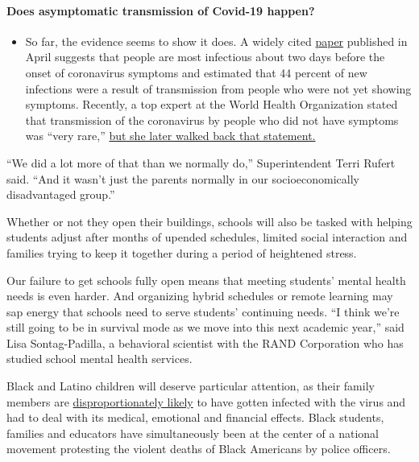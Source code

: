\begin{itemize}
{  \paragraph{Does asymptomatic transmission of Covid-19
  happen?}\label{does-asymptomatic-transmission-of-covid-19-happen}}

  \begin{itemize}
  \tightlist
  \item
    So far, the evidence seems to show it does. A widely cited
    \href{https://www.nature.com/articles/s41591-020-0869-5}{paper}
    published in April suggests that people are most infectious about
    two days before the onset of coronavirus symptoms and estimated that
    44 percent of new infections were a result of transmission from
    people who were not yet showing symptoms. Recently, a top expert at
    the World Health Organization stated that transmission of the
    coronavirus by people who did not have symptoms was ``very rare,''
    \href{https://www.nytimes.com/2020/06/09/world/coronavirus-updates.html?action=click\&pgtype=Article\&state=default\&region=MAIN_CONTENT_3\&context=storylines_faq\#link-1f302e21}{but
    she later walked back that statement.}
  \end{itemize}
\end{itemize}

``We did a lot more of that than we normally do,'' Superintendent Terri
Rufert said. ``And it wasn't just the parents normally in our
socioeconomically disadvantaged group.''

Whether or not they open their buildings, schools will also be tasked
with helping students adjust after months of upended schedules, limited
social interaction and families trying to keep it together during a
period of heightened stress.

Our failure to get schools fully open means that meeting students'
mental health needs is even harder. And organizing hybrid schedules or
remote learning may sap energy that schools need to serve students'
continuing needs. ``I think we're still going to be in survival mode as
we move into this next academic year,'' said Lisa Sontag-Padilla, a
behavioral scientist with the RAND Corporation who has studied school
mental health services.

Black and Latino children will deserve particular attention, as their
family members are
\href{https://www.nytimes.com/interactive/2020/07/05/us/coronavirus-latinos-african-americans-cdc-data.html}{disproportionately
likely} to have gotten infected with the virus and had to deal with its
medical, emotional and financial effects. Black students, families and
educators have simultaneously been at the center of a national movement
protesting the violent deaths of Black Americans by police officers.

